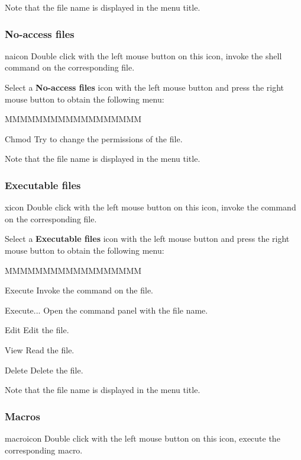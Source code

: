 Note that the file name is displayed in the menu title.


\subsubsection{No-access files}
\begin{ICON}{naicon}
Double click with the left mouse button on this icon, invoke the shell command
 on the corresponding file.
\end{ICON}

Select a {\bf No-access files} icon with the left mouse button and press
the right mouse button to obtain the following menu:


\begin{DLsf}{MMMMMMMMMMMMMMMMMM}
\item[Chmod]         Try to change the permissions of the file.
\end{DLsf}

Note that the file name is displayed in the menu title.


\subsubsection{Executable files}
\begin{ICON}{xicon}
Double click with the left mouse button on this icon, invoke the command
 on the corresponding file.
\end{ICON}

Select a {\bf Executable files} icon with the left mouse button and press
the right mouse button to obtain the following menu:


\begin{DLsf}{MMMMMMMMMMMMMMMMMM}
\item[Execute]         Invoke the command  on the file.
\item[Execute...]      Open the command panel  with the file name.
\item[Edit]            Edit the file.
\item[View]            Read the file.
\item[Delete]          Delete the file.
\end{DLsf}

Note that the file name is displayed in the menu title.


\subsubsection{\XPAW{} Macros}
\begin{ICON}{macroicon}
Double click with the left mouse button on this icon, execute the
corresponding macro.
\end{ICON}

